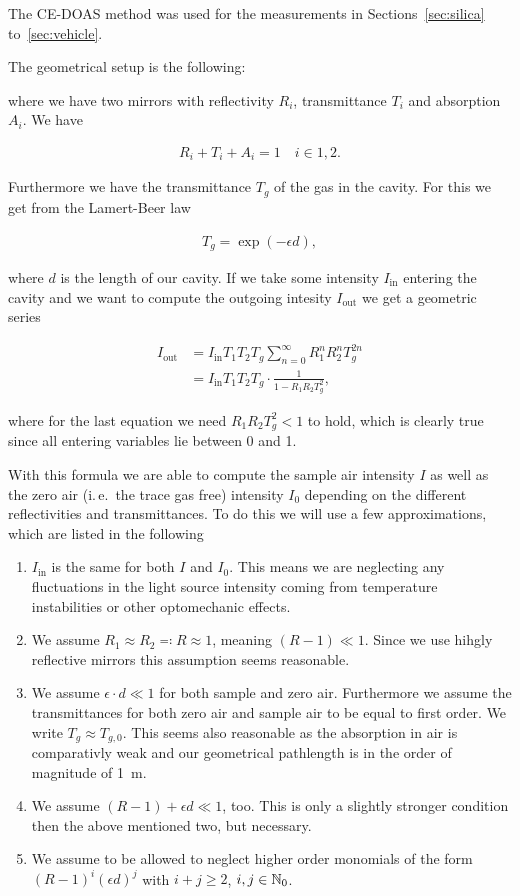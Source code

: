 The CE-DOAS method was used for the measurements in
Sections~\ref{sec:silica} to~\ref{sec:vehicle}. 

The geometrical setup is the following:

where we have two mirrors with reflectivity $R_i$, transmittance $T_i$
and absorption $A_i$. We have

\begin{align*}
  R_i + T_i + A_i = 1 \quad i \in{1,2}.
\end{align*}

Furthermore we have the transmittance $T_g$ of the gas in the
cavity. For this we get from the Lamert-Beer law

\begin{align*}
  T_g = \exp(-\epsilon d),
\end{align*}

where $d$ is the length of our cavity. If we take some intensity
$I_{\text{in}}$ entering the cavity and we want to compute the outgoing
intesity $I_{\text{out}}$ we get a geometric series

\begin{align*}
  I_{\text{out}} & = I_{\text{in}} T_1 T_2 T_g \sum_{n=0}^\infty R_1^n R_2^n T_g^{2n}\\
  & = I_{\text{in}} T_1 T_2 T_g \cdot \frac{1}{1 - R_1R_2T_g^2},
\end{align*}

where for the last equation we need $R_1R_2T_g^2 < 1$ to hold, which
is clearly true since all entering variables lie between 0 and 1.

With this formula we are able to compute the sample air intensity $I$
as well as the zero air (i.\,e.\ the trace gas free) intensity $I_0$
depending on the different reflectivities and transmittances. To do
this we will use a few approximations, which are listed in the
following

\begin{enumerate}
\item $I_{\text{in}}$ is the same for both $I$ and $I_0$. This means
  we are neglecting any fluctuations in the light source intensity
  coming from temperature instabilities or other optomechanic effects.
\item We assume $R_1 \approx R_2 \eqqcolon R \approx 1$, meaning $(R -
  1) \ll 1$. Since we use hihgly reflective mirrors this assumption
  seems reasonable.
\item We assume $\epsilon \cdot d \ll 1$ for both sample and zero
  air. Furthermore we assume the transmittances for both zero air and
  sample air to be equal to first order. We write $T_g \approx
  T_{g,0}$. This seems also reasonable as the absorption in air is
  comparativly weak and our geometrical pathlength is in the order of
  magnitude of \SI{1}{\meter}.
\item We assume  $(R - 1) + \epsilon d \ll 1$, too. This is only a
  slightly stronger condition then the above mentioned two, but
  necessary. 
\item We assume to be allowed to neglect higher order monomials of the
  form $(R-1)^i(\epsilon d)^j$  with $i+j \geq 2$, $i,j \in \mathbb{N}_0$.
\end{enumerate}

